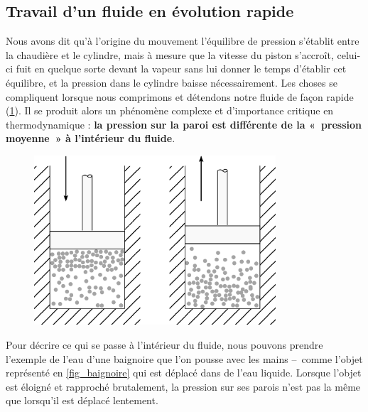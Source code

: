 	\subsection{Travail d’un fluide en évolution rapide}
	\label{ch_évolutions_irr_sf}

			Nous avons dit qu’à l’origine du mouvement l’équilibre de pression s’établit entre la chaudière et le cylindre, mais à mesure que la vitesse du piston s’accroît, celui-ci fuit en quelque sorte devant la vapeur sans lui donner le temps d’établir cet équilibre, et la pression dans le cylindre baisse \mbox{nécessairement}.
		Les choses se compliquent lorsque nous comprimons et détendons notre fluide de façon rapide (\cref{fig_molécules_rapide}). Il se produit alors un phénomène complexe et d’importance critique en thermodynamique : \textbf{la pression sur la paroi est différente de la «~pression moyenne~» à l’intérieur du fluide}.

		\begin{figure}
			\begin{center}
			\includegraphics[width=9cm]{images/particules_compression_rapide.png}
			\end{center}
			\label{fig_molécules_rapide}
		\end{figure}

		Pour décrire ce qui se passe à l’intérieur du fluide, nous pouvons prendre l’exemple de l’eau d’une baignoire que l’on pousse avec les mains --\ comme l’objet représenté en \cref{fig_baignoire} qui est déplacé dans de l’eau liquide. Lorsque l’objet est éloigné et rapproché brutalement, la pression sur ses parois n’est pas la même que lorsqu’il est déplacé lentement.


